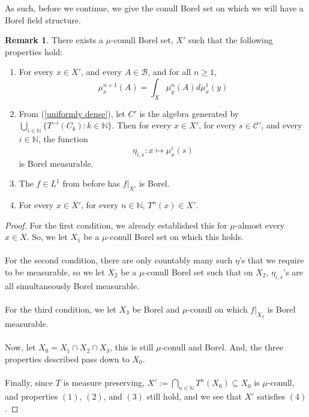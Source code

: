 \documentclass{article}
\let\oldref\ref
\renewcommand{\ref}[1]{(\oldref{#1})}
\theoremstyle{definition}
\newtheorem{remark}[theorem]{Remark}
\begin{document}
\noindent As such, before we continue, we give the conull Borel set on which we will have a Borel field structure.
\begin{remark}\label{universeofinterest}
    There exists a $ \mu $-conull Borel set, $ X' $ such that the following properties hold:
    \begin{enumerate}
        \item For every $ x\in X' $, and every $ A\in \mathcal{B} $, and for all $ n\geq 1 $,
        \[
        \mu_x^{n+1}(A) = \int_X \mu_y^n(A)d\mu_x^1(y)
        \]
        \item From \ref{uniformly dense}, let $ C' $ is the algebra generated by $ \bigcup_{i\in \mathbb{N}}\{T^{-i}(C_k):k\in \mathbb{N}\} $. Then for every $ x\in X'$, for every $ s\in \mathcal{C'} $, and every $i\in \mathbb{N} $, the function
        \[
        \eta_{i,s}:x\mapsto \mu_x^i(s)
        \]
        is Borel measurable.
        \item The $ f\in L^1 $ from before has $ f|_{X'} $ is Borel.
        \item For every $ x\in X' $, for every $ n\in \mathbb{N} $, $ T^n(x)\in X' $.
    \end{enumerate}
\end{remark}
    \begin{proof}
        For the first condition, we already established this for $ \mu $-almost every $ x\in X $. So, we let $ X_1 $ be a $ \mu $-conull Borel set on which this holds.\\\\
        For the second condition, there are only countably many such $ \eta $'s that we require to be measurable, so we let $ X_2 $ be a $ \mu $-conull Borel set such that on $ X_2 $, $ \eta_{i,s}$'s are all simultaneously Borel measurable.\\\\
        For the third condition, we let $ X_3 $ be Borel and $ \mu $-conull on which $ f|_{X_3} $ is Borel measurable. \\\\
        Now, let $ X_0 = X_1\cap X_2\cap X_3 $, this is still $ \mu $-conull and Borel. And, the three properties described pass down to $ X_0 $. \\\\
        Finally, since $ T $ is measure preserving, $ X':= \bigcap_{n\in \mathbb{N}}T^n(X_0)\subseteq X_0 $ is $ \mu $-conull, and properties $ (1) $, $ (2) $, and $ (3) $ still hold, and we see that $ X' $ satisfies $ (4) $.
    \end{proof}
\end{document}
